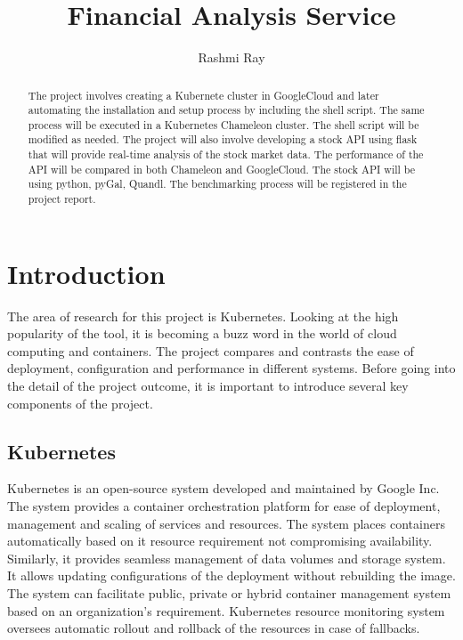 
\title{Financial Analysis Service}

\author{Rashmi Ray}

\renewcommand{\shortauthors}{Uma Kugan}

\begin{abstract}
The project involves creating a Kubernete cluster in GoogleCloud and later 
automating the installation and setup process by including the shell script.
The same process will be executed in a Kubernetes Chameleon cluster. The shell
script will be modified as needed. The project will also involve developing a stock 
API using flask that will provide real-time analysis of the stock market data. The performance
of the API will be compared in both Chameleon and GoogleCloud. The stock API will 
be using python, pyGal, Quandl. The benchmarking process will be registered in the project report.

\end{abstract}



\maketitle

\section{Introduction}

The area of research for this project is Kubernetes. Looking at the high popularity of 
the tool, it is becoming a buzz word in the world of cloud computing and containers. 
The project compares and contrasts the ease of deployment, configuration and performance 
in different systems. Before going into the detail of the project outcome, it is important
to introduce several key components of the project.

\subsection{Kubernetes}
Kubernetes is an open-source system developed and maintained by Google Inc. The system 
provides a container orchestration platform for ease of deployment, management and scaling 
of services and resources. The system places containers automatically based on it resource 
requirement not compromising availability. Similarly, it provides seamless management of 
data volumes and storage system. It allows updating configurations of the deployment without 
rebuilding the image. The system can facilitate public, private or hybrid container management 
system based on an organization’s requirement.  Kubernetes resource monitoring system oversees 
automatic rollout and rollback of the resources in case of fallbacks.


